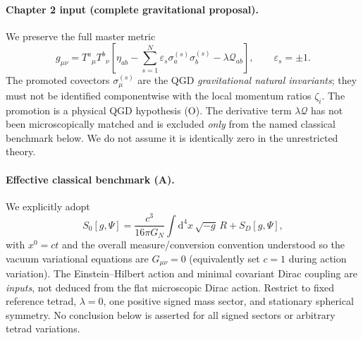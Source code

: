 \documentclass[11pt,a4paper]{article}
\theoremstyle{remark}
\newcommand{\dd}{\mathrm d}
\begin{document}
\paragraph{Chapter 2 input (complete gravitational proposal).}
We preserve the full master metric
\begin{equation}\label{eq:master}
\boxed{g_{\mu\nu}=T^a{}_{\mu}T^b{}_{\nu}
\left[\eta_{ab}-\sum_{s=1}^N\varepsilon_s\sigma_a^{(s)}\sigma_b^{(s)}-\lambda\mathcal Q_{ab}\right],\qquad \varepsilon_s=\pm1.}
\end{equation}
The promoted covectors $\sigma_\mu^{(s)}$ are the QGD \emph{gravitational natural invariants}; they must not be identified componentwise with the local momentum ratios $\zeta_i$. The promotion is a physical QGD hypothesis (O). The derivative term $\lambda\mathcal Q$ has not been microscopically matched and is excluded \emph{only} from the named classical benchmark below. We do not assume it is identically zero in the unrestricted theory.

\paragraph{Effective classical benchmark (A).}
We explicitly adopt
\begin{equation}\label{eq:benchmark}
 S_0[g,\Psi]=\frac{c^3}{16\pi G_N}\int \dd^4x\,\sqrt{-g}\,R+S_D[g,\Psi],
\end{equation}
with $x^0=ct$ and the overall measure/conversion convention understood so the vacuum variational equations are $G_{\mu\nu}=0$ (equivalently set $c=1$ during action variation). The Einstein--Hilbert action and minimal covariant Dirac coupling are \emph{inputs}, not deduced from the flat microscopic Dirac action. Restrict to fixed reference tetrad, $\lambda=0$, one positive signed mass sector, and stationary spherical symmetry. No conclusion below is asserted for all signed sectors or arbitrary tetrad variations.
\end{document}
